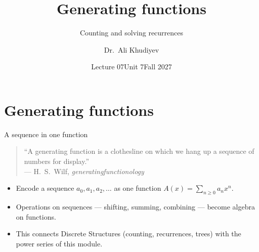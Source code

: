 \documentclass{wosm-slides}
\title[L07 \textperiodcentered\ Generating functions]{Generating functions}
\subtitle{Counting and solving recurrences}
\author{Dr.\ Ali Khudiyev}
\institute{WoSM Academy}
\date{Lecture 07\enspace\textperiodcentered\enspace Unit 7\enspace\textperiodcentered\enspace Fall 2027}
\begin{document}
\maketitle



\section{Generating functions}

\begin{frame}{A sequence in one function}
  \begin{quote}
    ``A generating function is a clothesline on which we hang up a sequence of numbers
    for display.'' \\ \hfill {\small\color{wosm-muted} --- H.~S.~Wilf, \emph{generatingfunctionology}}
  \end{quote}
  \pause
  \begin{itemize}
    \item Encode a sequence $a_0, a_1, a_2, \dots$ as one function
      $A(x) = \sum_{n \ge 0} a_n x^n$.
    \item Operations on sequences --- shifting, summing, combining --- become algebra on
      functions.
    \item This connects Discrete Structures (counting, recurrences, trees) with the power
      series of this module.
  \end{itemize}
\end{frame}
\end{document}
